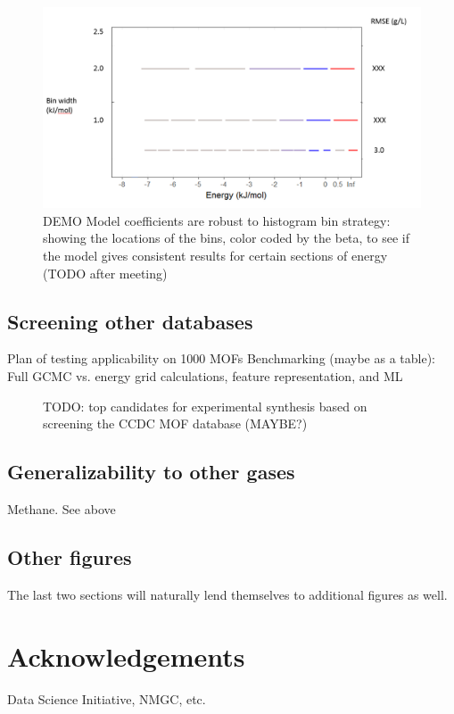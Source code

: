 \documentclass[letterpaper]{article}
\begin{document}
\begin{figure}[H]
	\centering
	\includegraphics[width=0.75\columnwidth]{Figs/beta_robustness.png}
	\caption{DEMO Model coefficients are robust to histogram bin strategy: showing the locations of the bins, color coded by the beta, to see if the model gives consistent results for certain sections of energy (TODO after meeting)}
	\label{fig:parity}
\end{figure}

\subsection{Screening other databases}
\begin{outline}
	\1 Plan of testing applicability on 1000 MOFs
	\1 Benchmarking (maybe as a table): Full GCMC vs. energy grid calculations, feature representation, and ML
\end{outline}
\begin{figure}[H]
	\centering
	\caption{TODO: top candidates for experimental synthesis based on screening the CCDC MOF database (MAYBE?)}
	\label{fig:candidates}
\end{figure}

\subsection{Generalizability to other gases}
\begin{outline}
	\1 Methane. See above
\end{outline}

\subsection{Other figures}
The last two sections will naturally lend themselves to additional figures as well.

\section{Acknowledgements}
Data Science Initiative, NMGC, etc.
\end{document}
